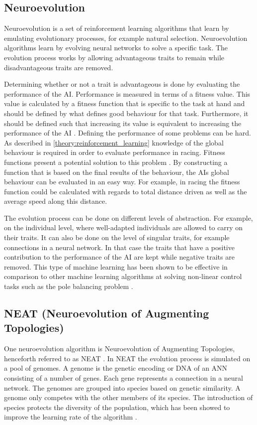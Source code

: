 \subsection{Neuroevolution}
\label{section:neuroevolution}
Neuroevolution is a set of reinforcement learning algorithms that learn by emulating evolutionary processes, for example natural selection. Neuroevolution algorithms learn by evolving neural networks to solve a specific task. The evolution process works by allowing advantageous traits to remain while disadvantageous traits are removed.  

Determining whether or not a trait is advantageous is done by evaluating the performance of the AI. Performance is measured in terms of a fitness value. This value is calculated by a fitness function that is specific to the task at hand and should be defined by what defines good behaviour for that task. Furthermore, it should be defined such that increasing its value is equivalent to increasing the performance of the AI \cite{nelson}. Defining the performance of some problems can be hard. As described in \ref{theory:reinforcement_learning} knowledge of the global behaviour is required in order to evaluate performance in racing. Fitness functions present a potential solution to this problem \cite{gomez:CoSyNE}. By constructing a function that is based on the final results of the behaviour, the AIs global behaviour can be evaluated in an easy way. For example, in racing the fitness function could be calculated with regards to total distance driven as well as the average speed along this distance.

The evolution process can be done on different levels of abstraction. For example, on the individual level, where well-adapted individuals are allowed to carry on their traits. It can also be done on the level of singular traits, for example connections in a neural network. In that case the traits that have a positive contribution to the performance of the AI are kept while negative traits are removed. This type of machine learning has been shown to be effective in comparison to other machine learning algorithms at solving non-linear control tasks such as the pole balancing problem \cite{gomez:efficient_nonlinear_control}.



\subsection{NEAT (Neuroevolution of Augmenting Topologies)} 
\label{theory:neat}
One neuroevolution algorithm is Neuroevolution of Augmenting Topologies, henceforth referred to as NEAT \cite{ozveren}. In NEAT the evolution process is simulated on a pool of genomes. A genome is the genetic encoding or DNA of an ANN consisting of a number of genes. Each gene represents a connection in a neural network. The genomes are grouped into species based on genetic similarity. A genome only competes with the other members of its species. The introduction of species protects the diversity of the population, which has been showed to improve the learning rate of the algorithm \cite{stanley:neat}.  


